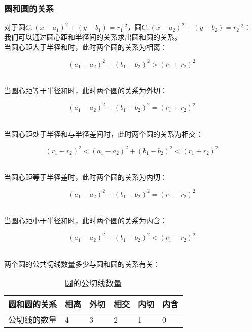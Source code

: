 \documentclass[UTF8]{ctexart}
\begin{document}
\newpage

\subsubsection{圆和圆的关系}
    对于圆$C:(x-a_1)^2+(y-b_1)=r_1~^2$，圆$C:(x-a_2)^2+(y-b_2)=r_2~^2$：\\[3mm]
    我们可以通过圆心距和半径间的关系求出圆和圆的关系。\\[5mm]
    当圆心距大于半径和时，此时两个圆的关系为相离：
    \begin{large}
        \begin{equation*}
            \left(a_1-a_2\right)^2+\left(b_1-b_2\right)^2>(r_1+r_2)^2
        \end{equation*}
    \end{large}\\
    当圆心距等于半径和时，此时两个圆的关系为外切：
    \begin{large}
        \begin{equation*}
            \left(a_1-a_2\right)^2+\left(b_1-b_2\right)^2=(r_1+r_2)^2
        \end{equation*}
    \end{large}\\
    当圆心距处于半径和与半径差间时，此时两个圆的关系为相交：
    \begin{large}
        \begin{equation*}
            (r_1-r_2)^2<\left(a_1-a_2\right)^2+\left(b_1-b_2\right)^2<(r_1+r_2)^2
        \end{equation*}
    \end{large}\\
    当圆心距等于半径差时，此时两个圆的关系为内切：
    \begin{large}
        \begin{equation*}
            \left(a_1-a_2\right)^2+\left(b_1-b_2\right)^2=(r_1-r_2)^2
        \end{equation*}
    \end{large}\\
    当圆心距小于半径和时，此时两个圆的关系为内含：
    \begin{large}
        \begin{equation*}
            \left(a_1-a_2\right)^2+\left(b_1-b_2\right)^2<(r_1-r_2)^2
        \end{equation*}
    \end{large}\\
    两个圆的公共切线数量多少与圆和圆的关系有关：\vspace{5pt}
    \begin{table}[h]
        \begin{center}
            \begin{tabular}{l|l|l|l|l|l}
                \hline
                圆和圆的关系\qquad\qquad&相离\qquad\qquad&外切\qquad\qquad&相交\qquad\qquad&内切\qquad\qquad&内含\qquad\qquad\\ \hline
                公切线的数量&4&3&2&1&0\\ \hline
            \end{tabular}
            \caption{圆的公切线数量}
        \end{center}
    \end{table}
\end{document}
